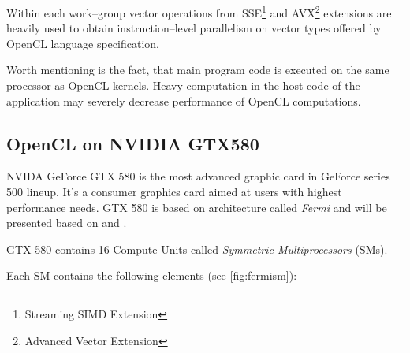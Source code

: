 Within each work--group vector operations from SSE\footnote{Streaming SIMD
Extension} and AVX\footnote{Advanced Vector Extension} extensions are heavily
used to obtain instruction--level parallelism on vector types offered by OpenCL
language specification.

Worth mentioning is the fact, that main program code is executed on the same
processor as OpenCL kernels. Heavy computation in the host code of the application
may severely decrease performance of OpenCL computations.

\subsection{OpenCL on NVIDIA GTX580}

NVIDA GeForce GTX 580 is the most advanced graphic card in GeForce series 500 lineup.
It's a consumer graphics card aimed at users with highest performance needs.
GTX 580 is based on architecture called \emph{Fermi} and will be presented based on
\cite[p59]{gaster2012heterogeneous} and \cite{nvidiafermi}.

GTX 580 contains 16 Compute Units called \emph{Symmetric Multiprocessors} (SMs).

Each SM contains the following elements (see \autoref{fig:fermism}):

